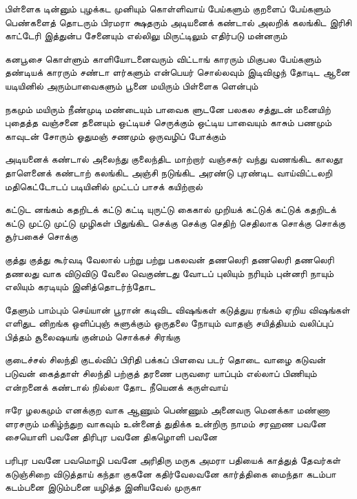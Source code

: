 \begin{flushleft}
{        பிள்ளைக டின்னும் புழக்கட முனியும்
        கொள்ளிவாய் பேய்களும் குறளைப் பேய்களும்
        பெண்களைத் தொடரும் பிரமரா க்ஷதரும்
        அடியனைக் கண்டால் அலறிக் கலங்கிட
        இரிசி காட்டேரி இத்துன்ப சேனையும்
        எல்லிலு மிருட்டிலும் எதிர்படு மன்னரும்

        கனபூசை கொள்ளும் காளியோடனைவரும்
        விட்டாங் காரரும் மிகுபல பேய்களும்
        தண்டியக் காரரும் சண்டா ளர்களும்
        என்பெயர் சொல்லவும் இடிவிழுந் தோடிட
        ஆனை யடியினில் அரும்பாவைகளும்
        பூனை மயிரும் பிள்ளைக ளென்பும்

        நகமும் மயிரும் நீண்முடி மண்டையும்
        பாவைக ளுடனே பலகல சத்துடன்
        மனையிற் புதைத்த வஞ்சனை தனையும்
        ஒட்டியச் செருக்கும் ஒட்டிய பாவையும்
        காசும் பணமும் காவுடன் சோரும்
        ஓதுமஞ் சணமும் ஒருவழிப் போக்கும்

        அடியனைக் கண்டால் அலைந்து குலைந்திட
        மாற்றார் வஞ்சகர் வந்து வணங்கிட
        காலதூ தாளெனைக் கண்டாற் கலங்கிட
        அஞ்சி நடுங்கிட அரண்டு புரண்டிட
        வாய்விட்டலறி மதிகெட்டோடப்
        படியினில் முட்டப் பாசக் கயிற்றால்

        கட்டுட னங்கம் கதறிடக் கட்டு
        கட்டி யுருட்டு கைகால் முறியக்
        கட்டுக் கட்டுக் கதறிடக் கட்டு
        முட்டு முட்டு முழிகள் பிதுங்கிட
        செக்கு செக்கு செதிற் செதிலாக
        சொக்கு சொக்கு சூர்பகைச் சொக்கு

        குத்து குத்து கூர்வடி வேலால்
        பற்று பற்று பகலவன் தணலெரி
        தணலெரி தணலெரி தணலது வாக
        விடுவிடு வேலை வெகுண்டது வோடப்
        புலியும் நரியும் புன்னரி நாயும்
        எலியும் கரடியும் இனித்தொடர்ந்தோட

        தேளும் பாம்பும் செய்யான் பூரான்
        கடிவிட விஷங்கள் கடுத்துய ரங்கம்
        ஏறிய விஷங்கள் எளிதுட னிறங்க
        ஒளிப்புஞ் சுளுக்கும் ஒருதலை நோயும்
        வாதஞ் சயித்தியம் வலிப்புப் பித்தம்
        சூலைஷயங் குன்மம் சொக்கச் சிரங்கு

        குடைச்சல் சிலந்தி குடல்விப் பிரிதி
        பக்கப் பிளவை படர் தொடை வாழை
        கடுவன் படுவன் கைத்தாள் சிலந்தி
        பற்குத் தரணை பருவரை யாப்பும்
        எல்லாப் பிணியும் என்றனைக் கண்டால்
        நில்லா தோட நீயெனக் கருள்வாய்

        ஈரே ழலகமும் எனக்குற வாக
        ஆணும் பெண்ணும் அனைவரு மெனக்கா
        மண்ணா ளரசரும் மகிழ்ந்துற வாகவும்
        உன்னைத் துதிக்க உன்றிரு நாமம்
        சரஹண பவனே சையொளி பவனே
        திரிபுர பவனே திகழொளி பவனே

        பரிபுர பவனே பவமொழி பவனே
        அரிதிரு மருக அமரா பதியைக்
        காத்துத் தேவர்கள் கடுஞ்சிறை விடுத்தாய்
        கந்தா குகனே கதிர்வேலவனே
        கார்த்திகை மைந்தா கடம்பா கடம்பனை
        இடும்பனை யழித்த இனியவேல் முருகா

}
\end{flushleft}

